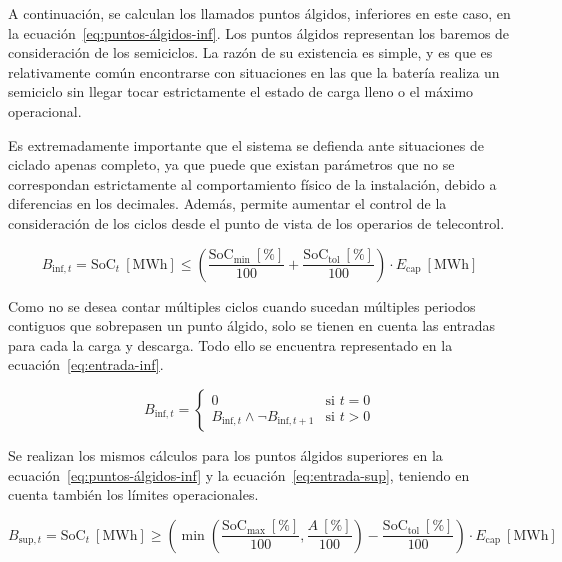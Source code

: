 A continuación, se calculan los llamados puntos álgidos, inferiores en este caso, en la ecuación~\ref{eq:puntos-álgidos-inf}. Los puntos álgidos representan los baremos de consideración de los semiciclos. La razón de su existencia es simple, y es que es relativamente común encontrarse con situaciones en las que la batería realiza un semiciclo sin llegar tocar estrictamente el estado de carga lleno o el máximo operacional.

Es extremadamente importante que el sistema se defienda ante situaciones de ciclado apenas completo, ya que puede que existan parámetros que no se correspondan estrictamente al comportamiento físico de la instalación, debido a diferencias en los decimales. Además, permite aumentar el control de la consideración de los ciclos desde el punto de vista de los operarios de telecontrol.

\begin{equation}
\label{eq:puntos-álgidos-inf}
B_{\text{inf}, t} = \mathrm{SoC}_{t}~[\text{MWh}] \le \left( \frac{\mathrm{SoC}_{\text{min}}~[\text{\%}]}{100} + \frac{\mathrm{SoC}_{\text{tol}}~[\text{\%}]}{100} \right) \cdot E_{\text{cap}}~[\text{MWh}]
\end{equation}

Como no se desea contar múltiples ciclos cuando sucedan múltiples periodos contiguos que sobrepasen un punto álgido, solo se tienen en cuenta las entradas para cada la carga y descarga. Todo ello se encuentra representado en la ecuación~\ref{eq:entrada-inf}.

\begin{equation}
\label{eq:entrada-inf}
B_{\text{inf}, t} = \begin{cases}
0                                                & \text{si } t = 0 \\
B_{\text{inf}, t} \land \neg B_{\text{inf}, t+1} & \text{si } t > 0
\end{cases}
\end{equation}

Se realizan los mismos cálculos para los puntos álgidos superiores en la ecuación~\ref{eq:puntos-álgidos-inf} y la ecuación~\ref{eq:entrada-sup}, teniendo en cuenta también los límites operacionales.

\begin{equation}
\label{eq:puntos-álgidos-sup}
B_{\text{sup}, t} = \mathrm{SoC}_{t}~[\text{MWh}] \ge \left( \min\left(\frac{\mathrm{SoC}_{\text{max}}~[\text{\%}]}{100}, \frac{A~[\text{\%}]}{100}\right) - \frac{\mathrm{SoC}_{\text{tol}}~[\text{\%}]}{100} \right) \cdot E_{\text{cap}}~[\text{MWh}]
\end{equation}

